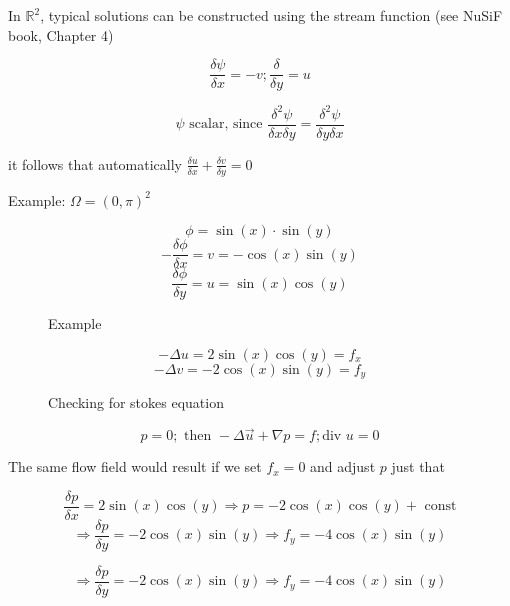 In $\mathds{R}^2$, typical solutions can be constructed using the stream function (see NuSiF book, Chapter 4) %
\begin{figure}[H]
	\centering
	\[ \frac{\delta \psi}{\delta x} = -v; \frac{\delta }{\delta y} = u \]
	\renewcommand{\thefigure}{S5}
	\caption{}
	\label{fig:disc-freesplipb}
\end{figure}
\begin{figure}[H]
	\centering
	\[ \psi \text{ scalar, since } \frac{\delta ^2 \psi}{\delta x \delta y} = \frac{\delta^2 \psi}{\delta y \delta x}\]
	\renewcommand{\thefigure}{S6}
	\caption{}
	\label{fig:disc-freesplipb}
\end{figure}
it follows that automatically $\frac{\delta u}{\delta x} + \frac{\delta v}{\delta y} = 0$

Example: $\Omega = (0, \pi)^2$
\begin{figure}[H]
	\centering
	\[ \phi = \sin(x) \cdot \sin(y) \]
	\[ - \frac{\delta \phi}{\delta x} = v = -\cos(x)\sin(y)\]
	\[ \frac{\delta \phi}{\delta y} = u = \sin(x)\cos(y)\]
	\renewcommand{\thefigure}{S7}
	\caption{Example}
	\label{fig:disc-freesplipb}
\end{figure}

\begin{figure}[H]
	\centering
	\[ - \Delta u = 2\sin(x) \cos(y) = f_x \]
	\[ - \Delta v = -2 \cos(x) \sin(y) = f_y \]
	\renewcommand{\thefigure}{S8}
	\caption{Checking for stokes equation}
	\label{fig:disc-freesplipb}
\end{figure}

\begin{figure}[H]
	\centering
	\[ p = 0; \text{ then } - \Delta \vec{u} + \nabla p = f; \text{div } u = 0\]
	\renewcommand{\thefigure}{S9}
	\caption{}
	\label{fig:disc-freesplipb}
\end{figure}

The same flow field would result if we set $f_x = 0$ and adjust $p$ just that
\begin{figure}[H]
	\centering
	\[ \frac{\delta p}{\delta x} = 2 \sin(x) \cos(y) \Rightarrow p = -2 \cos(x)\cos(y) + \text{ const} \]%
	\[ \Rightarrow \frac{\delta p}{\delta y} = -2 \cos(x) \sin(y) \Rightarrow f_y = -4 \cos(x) \sin(y)\]%
	\renewcommand{\thefigure}{S10}
	\caption{}
	\label{fig:disc-freesplipb}
\end{figure}
\begin{figure}[H]
	\centering
	\[ \Rightarrow \frac{\delta p}{\delta y} = -2 \cos(x) \sin(y) \Rightarrow f_y = -4 \cos(x) \sin(y)\]%
	\renewcommand{\thefigure}{S11}
	\caption{}
	\label{fig:disc-freesplipb}
\end{figure}

